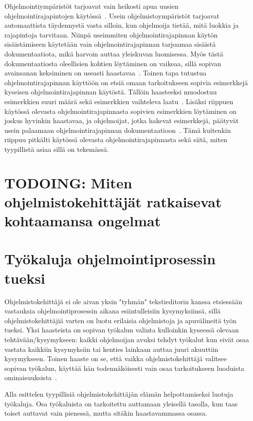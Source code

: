 \documentclass[finnish]{tktltiki2}
\theoremstyle{definition}
\theoremstyle{remark}
\begin{document}
Ohjelmointiympäristöt tarjoavat vain heikosti apua uusien ohjelmointirajapintojen käytössä~\cite{jungloid-mining}. Usein ohjelmistoympäristöt tarjoavat automaattista täydennystä vasta silloin, kun ohjelmoija tietää, mitä luokkia ja rajapintoja tarvitaan. Niinpä useimmiten ohjelmointirajapinnan käytön sisäistämiseen käytetään vain ohjelmointirajapinnan tarjoamaa sisäistä dokumentaatiota, mikä harvoin auttaa yleiskuvan luomisessa. Myös tästä dokumentaatiosta oleellisien kohtien löytäminen on vaikeaa, sillä sopivan avainsanan keksiminen on useasti haastavaa~\cite{what-to-search-for}.
Toinen tapa tutustua ohjelmointirajapinnan käyttöön on etsiä omaan tarkoitukseen sopivia esimerkkejä kyseisen ohjelmointirajapinnan käytöstä. Tällöin haasteeksi muodostuu esimerkkien suuri määrä sekä esimerkkien vaihteleva laatu~\cite{example-overflow-social-media-for-code-recommendations}. Lisäksi riippuen käytössä olevasta ohjelmointirajapinnasta sopivien esimerkkien löytäminen on joskus hyvinkin haastavaa, ja ohjelmoijat, jotka hakevat esimerkkejä, päätyvät usein palaamaan ohjelmointirajapinnan dokumentaatioon~\cite{asking-and-answering-api-questions}. Tämä kuitenkin riippuu pitkälti käytössä olevasta ohjelmointirajapinnasta sekä siitä, miten tyypillistä asiaa sillä on tekemässä.


\section{TODOING: Miten ohjelmistokehittäjät ratkaisevat kohtaamansa ongelmat}

\section{Työkaluja ohjelmointiprosessin tueksi}
Ohjelmistokehittäjä ei ole aivan yksin "tyhmän" tekstieditorin kanssa etsiessään vastauksia ohjelmointiprosessin aikana esiintulleisiin kysymyksiinsä, sillä ohjelmistokehittäjiä varten on luotu erilaisia ohjelmistoja ja apuvälineitä työn tueksi.
Yksi haasteista on sopivan työkalun valinta kulloinkin kyseessä olevaan tehtävään/kysymykseen: kaikki ohjelmoijan avuksi tehdyt työkalut kun eivät osaa vastata kaikkiin kysymyksiin tai kenties lainkaan auttaa juuri akuuttiin kysymykseen. Toinen haaste on se, että vaikka ohjelmistokehittäjä valitsee sopivan työkalun, käyttää hän todennäköisesti vain osaa tarkoitukseen luoduista ominaisuuksista~\cite{whyline}.

Alla esittelen tyypillisiä ohjelmistokehittäjän elämän helpottamiseksi luotuja työkaluja. Osa työkaluista on tarkoitettu auttamaan yleisellä tasolla, kun taas toiset auttavat vain pienessä, mutta sitäkin haastavammassa osassa.
\end{document}
